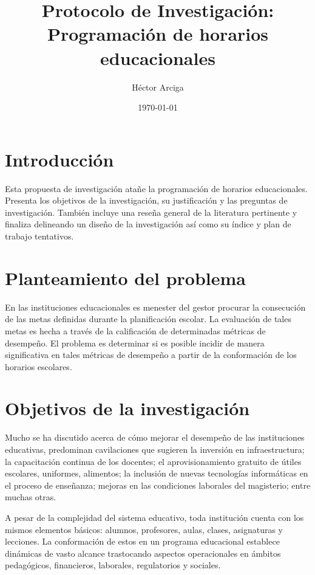 \documentclass[spanish,draft,12pt,headsepline,footsepline,paper=letter]{scrreprt}
\begin{document}
\title{Protocolo de Investigación: Programación de horarios educacionales}
\author{Héctor Arciga}
\date{\today}

\maketitle

\section*{Introducción}
Esta propuesta de investigación atañe la programación de horarios educacionales. Presenta los objetivos de la investigación, su justificación y las preguntas de investigación. También incluye una reseña general de la literatura pertinente y finaliza delineando un diseño de la investigación así como su índice y plan de trabajo tentativos.

\section*{Planteamiento del problema}

En las instituciones educacionales es menester del gestor procurar la consecución de las metas definidas durante la planificación escolar. La evaluación de tales metas es hecha a través de la calificación de determinadas métricas de desempeño. El problema es determinar si es posible incidir de manera significativa en tales métricas de desempeño a partir de la conformación de los horarios escolares. 

\section*{Objetivos de la investigación}
Mucho se ha discutido acerca de cómo mejorar el desempeño de las instituciones educativas, predominan cavilaciones que sugieren la inversión en infraestructura; la capacitación continua de los docentes; el aprovisionamiento gratuito de útiles escolares, uniformes, alimentos; la  inclusión de nuevas tecnologías informáticas en el proceso de enseñanza; mejoras en las condiciones laborales del magisterio; entre muchas otras. 

A pesar de la complejidad del sistema educativo, toda institución cuenta con los mismos elementos básicos: alumnos, profesores, aulas, clases, asignaturas y lecciones. La conformación de estos en un programa educacional establece dinámicas de vasto alcance trastocando aspectos operacionales en ámbitos pedagógicos, financieros, laborales, regulatorios y sociales.
\end{document}
